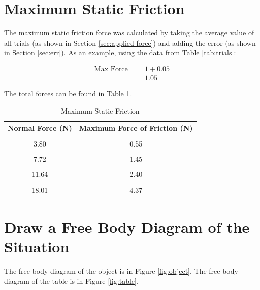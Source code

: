 \documentclass{chemlab}
\begin{document}
\hypertarget{maximum-static-friction}{%
\section{Maximum Static Friction}\label{maximum-static-friction}}

The maximum static friction force was calculated by taking the average
value of all trials (as shown in Section \ref{sec:applied-force}) and
adding the error (as shown in Section \ref{sec:err}). As an example,
using the data from Table \ref{tab:trials}:

\begin{eqnarray}
  \text{Max Force} & = & 1 + 0.05 \\
                   & = & 1.05
\end{eqnarray}

The total forces can be found in Table \ref{tab:max-fric}.

\begin{table}[H]

\caption{\label{tab:max-fric}Maximum Static Friction}
\centering
\begin{tabular}[t]{c|c}
\hline
Normal Force (N) & Maximum Force of Friction (N)\\
\hline
\cellcolor{gray!6}{1.84} & \cellcolor{gray!6}{1.05}\\
\hline
3.80 & 0.55\\
\hline
\cellcolor{gray!6}{5.76} & \cellcolor{gray!6}{0.95}\\
\hline
7.72 & 1.45\\
\hline
\cellcolor{gray!6}{9.68} & \cellcolor{gray!6}{1.90}\\
\hline
11.64 & 2.40\\
\hline
\cellcolor{gray!6}{13.60} & \cellcolor{gray!6}{2.70}\\
\hline
18.01 & 4.37\\
\hline
\end{tabular}
\end{table}

\hypertarget{draw-a-free-body-diagram-of-the-situation}{%
\section{Draw a Free Body Diagram of the
Situation}\label{draw-a-free-body-diagram-of-the-situation}}

The free-body diagram of the object is in Figure \ref{fig:object}. The
free body diagram of the table is in Figure \ref{fig:table}.
\end{document}
